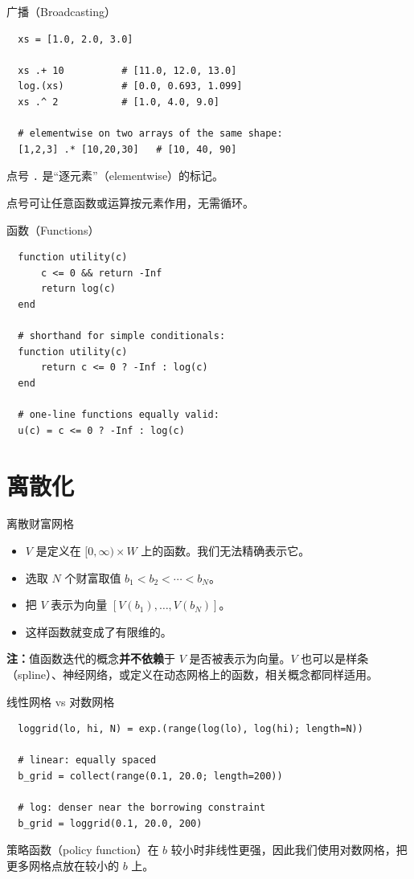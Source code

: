 \documentclass[10pt,aspectratio=169]{beamer}
\begin{document}
\begin{frame}[fragile]{广播（Broadcasting）}
  \begin{lstlisting}
  xs = [1.0, 2.0, 3.0]

  xs .+ 10          # [11.0, 12.0, 13.0]
  log.(xs)          # [0.0, 0.693, 1.099]
  xs .^ 2           # [1.0, 4.0, 9.0]

  # elementwise on two arrays of the same shape:
  [1,2,3] .* [10,20,30]   # [10, 40, 90]
  \end{lstlisting}
  点号 \texttt{.} 是``逐元素''（elementwise）的标记。

  点号可让任意函数或运算按元素作用，无需循环。
\end{frame}

\begin{frame}[fragile]{函数（Functions）}
  \begin{lstlisting}
  function utility(c)
      c <= 0 && return -Inf
      return log(c)
  end

  # shorthand for simple conditionals:
  function utility(c)
      return c <= 0 ? -Inf : log(c)
  end

  # one-line functions equally valid:
  u(c) = c <= 0 ? -Inf : log(c)
  \end{lstlisting}
\end{frame}

\section{离散化}

\begin{frame}{离散财富网格}
  \begin{itemize}
    \item $V$ 是定义在 $[0, \infty) \times W$ 上的函数。我们无法精确表示它。
    \item 选取 $N$ 个财富取值 $b_1 < b_2 < \cdots < b_N$。
    \item 把 $V$ 表示为向量 $[V(b_1), \ldots, V(b_N)]$。
    \item 这样函数就变成了有限维的。
  \end{itemize}
  \textbf{注：}值函数迭代的概念\textbf{并不依赖}于 $V$ 是否被表示为向量。$V$ 也可以是样条（spline）、神经网络，或定义在动态网格上的函数，相关概念都同样适用。
\end{frame}

\begin{frame}[fragile]{线性网格 vs 对数网格}
  \begin{lstlisting}
  loggrid(lo, hi, N) = exp.(range(log(lo), log(hi); length=N))

  # linear: equally spaced
  b_grid = collect(range(0.1, 20.0; length=200))

  # log: denser near the borrowing constraint
  b_grid = loggrid(0.1, 20.0, 200)
  \end{lstlisting}
  策略函数（policy function）在 $b$ 较小时非线性更强，因此我们使用对数网格，把更多网格点放在较小的 $b$ 上。
\end{frame}
\end{document}
